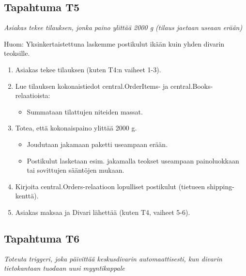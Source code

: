 \documentclass[11pt,a4paper]{article}
\begin{document}
\subsection{Tapahtuma T5}
{\large{\textit{Asiakas tekee tilauksen, jonka paino ylittää 2000 g (tilaus jaetaan useaan erään)}}}

Huom: Yksinkertaistettuna laskemme postikulut ikään kuin yhden divarin teoksille.

\begin{enumerate}
	\item Asiakas tekee tilauksen (kuten T4:n vaiheet 1-3).
	\item Lue tilauksen kokonaistiedot central.OrderItems- ja central.Books-relaatioista:\
	      \begin{itemize}
		      \item Summataan tilattujen niteiden massat.
	      \end{itemize}
	\item Totea, että kokonaispaino ylittää 2000 g.
	      \begin{itemize}
		      \item Joudutaan jakamaan paketti useampaan erään.
		      \item Postikulut lasketaan esim. jakamalla teokset useampaan painoluokkaan tai sovittujen sääntöjen mukaan.
	      \end{itemize}
	\item Kirjoita central.Orders-relaatioon lopulliset postikulut (tietueen shipping-kenttä).
	\item Asiakas maksaa ja Divari lähettää (kuten T4, vaiheet 5-6).
\end{enumerate}

\subsection{Tapahtuma T6}
{\large{\textit{Toteuta triggeri, joka päivittää keskusdivarin automaattisesti, kun divarin tietokantaan tuodaan uusi myyntikappale}}}
\end{document}
